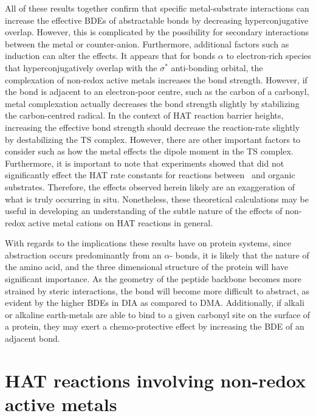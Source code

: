 All of these results together confirm that specific metal-substrate interactions
can increase the effective BDEs of abstractable  bonds by decreasing
hyperconjugative overlap. However, this is complicated by the possibility for
secondary interactions between the metal or counter-anion. Furthermore,
additional factors such as induction can alter the effects. It appears that for
 bonds $\alpha$ to electron-rich species that hyperconjugatively
overlap with the $\sigma^*$ anti-bonding orbital, the complexation of non-redox
active metals increases the  bond strength. However, if the 
bond is adjacent to an electron-poor centre, such as the carbon of a carbonyl,
metal complexation actually decreases the bond strength slightly by stabilizing
the carbon-centred radical.  In the context of HAT reaction barrier heights,
increasing the effective  bond strength should decrease the
reaction-rate slightly by destabilizing the TS complex. However, there are other
important factors to consider such as how the metal effects the dipole moment in
the TS complex.  Furthermore, it is important to note that experiments showed
that  did not significantly effect the HAT rate constants for
reactions between \cumo\ and organic substrates. Therefore, the effects observed
herein likely are an exaggeration of what is truly occurring in situ.
Nonetheless, these theoretical calculations may be useful in developing an
understanding of the subtle nature of the effects of non-redox active metal
cations on HAT reactions in general.

With regards to the implications these results have on protein systems, since
abstraction occurs predominantly from an $\alpha$- bonds, it is likely
that the nature of the amino acid, and the three dimensional structure of the
protein will have significant importance. As the geometry of the peptide
backbone becomes more strained by steric interactions, the  bond will
become more difficult to abstract, as evident by the higher  BDEs in DIA
as compared to DMA. Additionally, if alkali or alkaline earth-metals are able to
bind to a given carbonyl site on the surface of a protein, they may exert a
chemo-protective effect by increasing the BDE of an adjacent 
bond.

\section{HAT reactions involving non-redox active metals}

